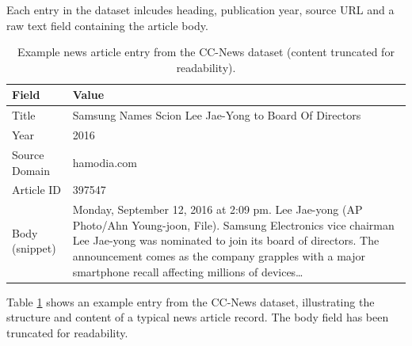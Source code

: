 Each entry in the dataset inlcudes heading, publication year, source URL and a raw text field containing the article body.

\begin{table}[!htbp]
    \centering
    \caption{Example news article entry from the CC-News dataset (content truncated for readability).}
    \label{tab:dataset-example}
    \renewcommand{\arraystretch}{1.2}
    \begin{tabular}{|l|p{10cm}|}
        \hline
        \textbf{Field} & \textbf{Value}                                                                                                                                                                                \\
        \hline
        Title          & Samsung Names Scion Lee Jae-Yong to Board Of Directors                                                                                                                                        \\
        \hline
        Year           & 2016                                                                                                                                                                                          \\
        \hline
        Source Domain  & hamodia.com                                                                                                                                                                                   \\
        \hline
        Article ID     & 397547                                                                                                                                                                                        \\
        \hline
        Body (snippet) &
        Monday, September 12, 2016 at 2:09 pm.
        Lee Jae-yong (AP Photo/Ahn Young-joon, File).
        Samsung Electronics vice chairman Lee Jae-yong was nominated to join its board of directors. The announcement comes as the company grapples with a major smartphone recall affecting millions of devices\ldots \\
        \hline
    \end{tabular}
\end{table}

Table \ref{tab:dataset-example} shows an example entry from the CC-News dataset, illustrating the structure and content of a typical news article record. The body field has been truncated for readability.

